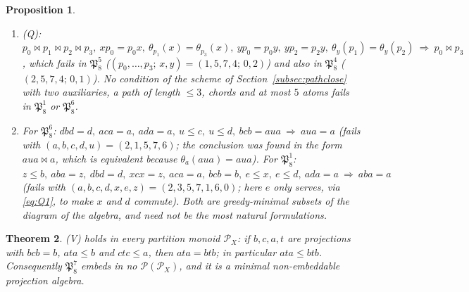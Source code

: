 \documentclass[11pt]{amsart}
\newtheorem{theorem}{Theorem}[section]
\newtheorem{proposition}[theorem]{Proposition}
\theoremstyle{definition}
\renewcommand{\P}{\mathcal{P}}
\begin{document}
\begin{proposition}
\begin{enumerate}[label=\textup{(\alph*)},nosep]
\begin{align*}
&xp_0=p_0x,\ xp_2=p_2x,\ \theta_{p_1}(x)=\theta_{p_3}(x),\ \theta_x(p_2)=\theta_x(p_3)\quad(\mathfrak P_8^4),\\
&xp_1=p_1x,\ xp_2=p_2x,\ \theta_x(p_0)=\theta_x(p_2),\ \theta_{p_1}(x)=\theta_{p_3}(x)\quad(\mathfrak P_8^2);
\end{align*}
the two of size $5$ are $xp_0=p_0x,\ xp_1=p_1x,\ xp_2=p_2x,\ \theta_x(p_0)=\theta_x(p_2),\ \theta_x(p_1)=\theta_x(p_3)$ and its reversal ($\mathfrak P_8^2$). All of them combine two commutation atoms, one ``seen alike'' atom for two vertices of the same parity and one ``sees alike'' atom.
\item \textup{(Q)}: $p_0\bowtie p_1\bowtie p_2\bowtie p_3,\ xp_0=p_0x,\ \theta_{p_1}(x)=\theta_{p_3}(x),\ yp_0=p_0y,\ yp_2=p_2y,\ \theta_y(p_1)=\theta_y(p_2)\ \Longrightarrow\ p_0\bowtie p_3$, which fails in $\mathfrak P_8^5$ ($(p_0,\dots,p_3;\,x,y)=(1,5,7,4;\,0,2)$) and also in $\mathfrak P_8^4$ ($(2,5,7,4;\,0,1)$). No condition of the scheme of Section~\ref{subsec:pathclose} with two auxiliaries, a path of length $\le3$, chords and at most $5$ atoms fails in $\mathfrak P_8^1$ or $\mathfrak P_8^6$.
\item For $\mathfrak P_8^6$: $dbd=d,\ aca=a,\ ada=a,\ u\le c,\ u\le d,\ bcb=aua\ \Longrightarrow\ aua=a$ (fails with $(a,b,c,d,u)=(2,1,5,7,6)$; the conclusion was found in the form $aua\bowtie a$, which is equivalent because $\theta_a(aua)=aua$). For $\mathfrak P_8^1$: $z\le b,\ aba=z,\ dbd=d,\ xcx=z,\ aca=a,\ bcb=b,\ e\le x,\ e\le d,\ ada=a\ \Longrightarrow\ aba=a$ (fails with $(a,b,c,d,x,e,z)=(2,3,5,7,1,6,0)$; here $e$ only serves, via \eqref{eq:Q1}, to make $x$ and $d$ commute). Both are greedy-minimal subsets of the diagram of the algebra, and need not be the most natural formulations.
\end{enumerate}
\end{proposition}


\begin{theorem}\label{thm:V}
(V) holds in every partition monoid $\P_X$: if $b,c,a,t$ are projections with $bcb=b$, $ata\le b$ and $ctc\le a$, then $ata=btb$; in particular $ata\le btb$. Consequently $\mathfrak P_8^7$ embeds in no $\P(\P_X)$, and it is a minimal non-embeddable projection algebra.
\end{theorem}
\end{document}
